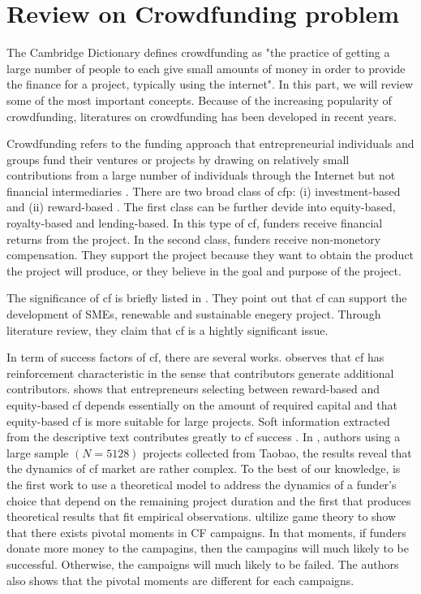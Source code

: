 \section{Review on Crowdfunding problem}

The Cambridge Dictionary \parencite{2023} defines crowdfunding as
"the practice of getting a large number of people to each give small amounts of money in order to provide the finance for a project, typically using the internet".
In this part, we will review some of the most important concepts.
Because of the increasing popularity of crowdfunding, literatures on crowdfunding has been developed in recent years.


Crowdfunding refers to the funding approach that entrepreneurial individuals and groups
fund their ventures or projects by drawing on relatively small contributions
from a large number of individuals through the Internet but not financial intermediaries \parencite{mollick2014}.
There are two broad class of \acrshort{cfp}: (i) investment-based and (ii) reward-based \parencite{belleflamme2015}.
The first class can be further devide into equity-based, royalty-based and lending-based.
In this type of \acrshort{cf}, funders receive financial returns from the project.
In the second class, funders receive non-monetory compensation.
They support the project because they want to obtain the product the project will produce,
or they believe in the goal and purpose of the project.

The significance of \acrshort{cf} is briefly listed in \parencite{xie2019}.
They point out that \acrshort{cf} can support the development of SMEs,
renewable and sustainable enegery project.
Through literature review, they claim that \acrshort{cf} is a hightly significant issue.

In term of success factors of \acrshort{cf}, there are several works.
\parencite{colombo2015} observes that \acrshort{cf} has reinforcement characteristic in the sense that contributors generate additional contributors.
\parencite{belleflamme2015} shows that entrepreneurs selecting between reward-based and equity-based \acrshort{cf} depends
essentially on the amount of required capital and that equity-based \acrshort{cf} is more suitable for large projects.
Soft information extracted from the descriptive text contributes greatly to \acrshort{cf} success \parencite{jiang2020}.
In \parencite{xie2019}, authors using a large sample $(N=5128)$ projects collected from Taobao,
the results reveal that the dynamics of \acrshort{cf} market are rather complex.
To the best of our knowledge, \parencite{salahaldin2019} is the first work to use a theoretical model to address
the dynamics of a funder’s choice that depend on the remaining project duration
and the first that produces theoretical results that fit empirical observations.
\parencite{lindasalahaldin2022} ultilize game theory to show that there exists pivotal moments in CF campaigns.
In that moments, if funders donate more money to the campagins, then the campagins will much likely to be successful.
Otherwise, the campaigns will much likely to be failed.
The authors also shows that the pivotal moments are different for each campaigns.

